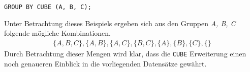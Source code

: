 \texttt{GROUP BY CUBE (A, B, C);}

Unter Betrachtung dieses Beispiels ergeben sich aus den Gruppen \textit{A, B, C}
folgende mögliche Kombinationen.
\begin{align*}
	\{ A, B, C\}, \{A, B\}, \{A, C\}, \{B, C\}, \{A\}, \{B\}, \{C\}, \{ \}
\end{align*}
Durch Betrachtung dieser Mengen wird klar, dass die \texttt{CUBE} Erweiterung einen
noch genaueren Einblick in die vorliegenden Datensätze gewährt.
